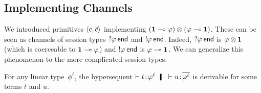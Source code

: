     \subsection{Implementing Channels}
    We introduced primitives $\langle{c,\bar{c}}\rangle$ implementing
    $(\mathbf{1}\multimap\varphi)\otimes(\varphi\multimap\mathbf{1})$.
    These can be seen as channels of session types
    $\mathop{?}\kern -2pt{\varphi}\hskip 2pt{\mathsf{end}}$ and $\mathop{!}\kern -2pt{\varphi}\hskip 2pt{\mathsf{end}}$.
    Indeed, $\mathop{?}\kern -2pt{\varphi}\hskip 2pt{\mathsf{end}}$ is $\varphi\otimes\mathbf{1}$ (which is
    coerceable to $\mathbf{1}\multimap\varphi$) and $\mathop{!}\kern -2pt{\varphi}\hskip 2pt{\mathsf{end}}$ is
    $\varphi\multimap \mathbf{1}$.
    We can generalize this phenomenon to the more complicated session
    types.
     \begin{proposition}
      For any linear type~$\phi^\ell$\kern -2pt, the hypersequent
      $\tr\tj{t}{\phi^\ell}\hmid \tr\tj{u}{\overline{\phi^\ell}}$
      is derivable for some terms $t$ and $u$.
     \end{proposition}
